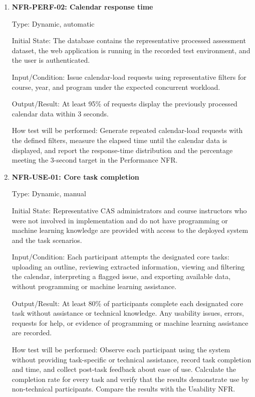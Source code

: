 \documentclass[12pt, titlepage]{article}
\begin{document}
\begin{enumerate}

\item{\label{NFR-PERF-02}\textbf{NFR-PERF-02: Calendar response time}\\}

Type: Dynamic, automatic

Initial State: The database contains the representative processed assessment
dataset, the web application is running in the recorded test environment, and
the user is authenticated.

Input/Condition: Issue calendar-load requests using representative filters
for course, year, and program under the expected concurrent workload.

Output/Result: At least 95\% of requests display the previously processed
calendar data within 3 seconds.

How test will be performed: Generate repeated calendar-load requests with the
defined filters, measure the elapsed time until the calendar data is displayed,
and report the response-time distribution and the percentage meeting the
3-second target in the Performance NFR.

\item{\label{NFR-USE-01}\textbf{NFR-USE-01: Core task completion}\\}

Type: Dynamic, manual

Initial State: Representative CAS administrators and course instructors who
were not involved in implementation and do not have programming or machine
learning knowledge are provided with access to the deployed system and the
task scenarios.

Input/Condition: Each participant attempts the designated core tasks:
uploading an outline, reviewing extracted information, viewing and filtering
the calendar, interpreting a flagged issue, and exporting available data,
without programming or machine learning assistance.

Output/Result: At least 80\% of participants complete each designated core
task without assistance or technical knowledge. Any usability issues, errors,
requests for help, or evidence of programming or machine learning assistance
are recorded.

How test will be performed: Observe each participant using the system without
providing task-specific or technical assistance, record task completion and
time, and collect post-task feedback about ease of use. Calculate the
completion rate for every task and verify that the results demonstrate use by
non-technical participants. Compare the results with the Usability NFR.


\end{enumerate}
\end{document}
